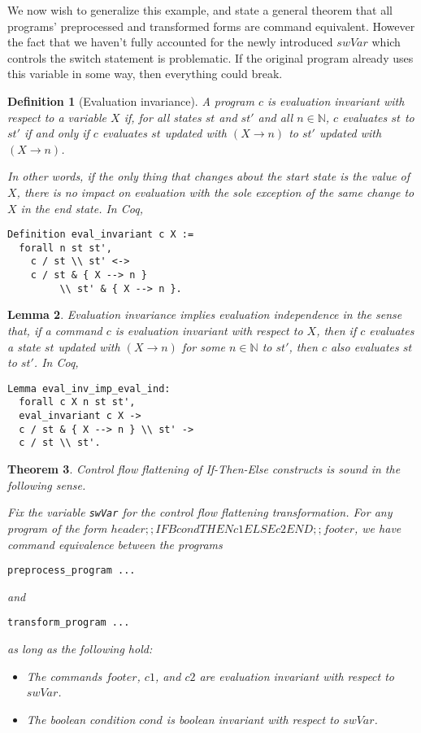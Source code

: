 \documentclass[compsoc,conference,a4paper,10pt,times]{IEEEtran}
\newtheorem{theorem}{Theorem}[section]
\newtheorem{lemma}[theorem]{Lemma}
\newtheorem{defin}[theorem]{Definition}
\begin{document}
We now wish to generalize this example, and state a general theorem that all programs' preprocessed and transformed forms are command equivalent. However the fact that we haven't fully accounted for the newly introduced $swVar$ which controls the switch statement is problematic. If the original program already uses this variable in some way, then everything could break.

\begin{defin}[Evaluation invariance]
A program $c$ is \emph{evaluation invariant} with respect to a variable $X$ if, for all states $st$ and $st'$ and all $n \in \mathbb{N}$, $c$ evaluates $st$ to $st'$ if and only if $c$ evaluates $st$ updated with $(X \longrightarrow n)$ to $st'$ updated with $(X\longrightarrow n)$.
\par In other words, if the only thing that changes about the start state is the value of $X$, there is no impact on evaluation with the sole exception of the same change to $X$ in the end state.  In Coq,
\begin{verbatim}
Definition eval_invariant c X := 
  forall n st st', 
    c / st \\ st' <-> 
    c / st & { X --> n } 
         \\ st' & { X --> n }.
\end{verbatim}
\end{defin}

\begin{lemma}\label{independence}
Evaluation invariance implies evaluation independence in the sense that, if a command $c$ is evaluation invariant with respect to $X$, then if $c$ evaluates a state $st$ updated with $(X\longrightarrow n)$ for some $n \in \mathbb{N}$ to $st'$, then $c$ also evaluates $st$ to $st'$.  In Coq,
\begin{verbatim}
Lemma eval_inv_imp_eval_ind: 
  forall c X n st st', 
  eval_invariant c X ->
  c / st & { X --> n } \\ st' -> 
  c / st \\ st'.
\end{verbatim}
\end{lemma}

\begin{theorem}\label{maintheo}
Control flow flattening of If-Then-Else constructs is sound in the following sense.  
\par Fix the variable \verb$swVar$ for the control flow flattening transformation.  For any program of the form $header ;; IFB cond THEN c1 ELSE c2 END ;; footer$, we have command equivalence between the programs
\begin{verbatim}preprocess_program ...\end{verbatim}
and
\begin{verbatim}transform_program ...\end{verbatim}
as long as the following hold:
\begin{itemize}
    \item The commands $footer$, $c1$, and $c2$ are evaluation invariant with respect to $swVar$.
    \item The boolean condition $cond$ is boolean invariant with respect to $swVar$.
\end{itemize}
\end{theorem}
\end{document}
